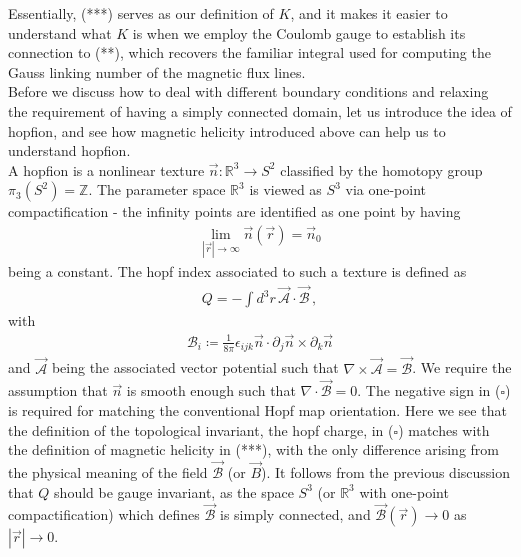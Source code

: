 \documentclass[11pt, onesided]{book}
\theoremstyle{break}
\theoremstyle{break}
\newcommand{\R}{\mathbb{R}}
\newcommand{\Z}{\mathbb{Z}}
\newcommand{\pd}{\partial}
\begin{document}
Essentially, (***) serves as our definition of $K$, and it makes it easier to understand what $K$ is when we employ the Coulomb gauge to establish its connection to (**), which recovers the familiar integral used for computing the Gauss linking number of the magnetic flux lines. \\

Before we discuss how to deal with different boundary conditions and relaxing the requirement of having a simply connected domain, let us introduce the idea of hopfion, and see how magnetic helicity introduced above can help us to understand hopfion.\\

A hopfion is a nonlinear texture $\vec{n}:\R^3 \to S^2$ classified by the homotopy group $\pi_3(S^2) = \Z$. The parameter space $\R^3$ is viewed as $S^3$ via one-point compactification -  the infinity points are identified as one point by having 
\begin{align*}
\lim_{|\vec{r}|\to \infty}\vec{n}(\vec{r}) = \vec{n}_0
\end{align*}
being a constant. The hopf index associated to such a texture is defined as
\begin{align*}
Q = -\int d^3r \,\mathcal{\vec{A}}\cdot \mathcal{\vec{B}}\,, \tag{$\square$}
\end{align*}
with
\begin{align*}
\mathcal{B}_i \coloneqq \frac{1}{8\pi}\epsilon_{ijk}\vec{n}\cdot \pd_j\vec{n}\times \pd_k \vec{n}
\end{align*}
and $\mathcal{\vec{A}}$ being the associated vector potential such that $\nabla\times \vec{\mathcal{A}} = \mathcal{\vec{B}}$. We require the assumption that $\vec{n}$ is smooth enough such that $\nabla \cdot \vec{\mathcal{B}} = 0$. The negative sign in ($\square$) is required for matching the conventional Hopf map orientation. Here we see that the definition of the topological invariant, the hopf charge, in ($\square$) matches with the definition of magnetic helicity in (***), with the only difference arising from the physical meaning of the field $\mathcal{\vec{B}}$ (or $\vec{B}$). It follows from the previous discussion that $Q$ should be gauge invariant, as the space $S^3$ (or $\R^3$ with one-point compactification) which defines $\mathcal{\vec{B}}$ is simply connected, and $\mathcal{\vec{B}}(\vec{r})\to 0$ as $|\vec{r}| \to 0$. \\
\end{document}
